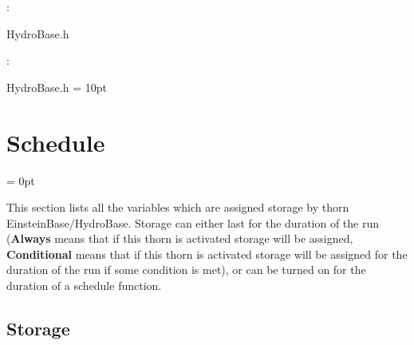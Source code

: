 \vspace{5mm}

: 



HydroBase.h
\vspace{2mm}

: 

HydroBase.h
\vspace{2mm}\parskip = 10pt 

\section{Schedule} 


\parskip = 0pt


\noindent This section lists all the variables which are assigned storage by thorn EinsteinBase/HydroBase.  Storage can either last for the duration of the run ({\bf Always} means that if this thorn is activated storage will be assigned, {\bf Conditional} means that if this thorn is activated storage will be assigned for the duration of the run if some condition is met), or can be turned on for the duration of a schedule function.


\subsection*{Storage}

\hspace{5mm}

